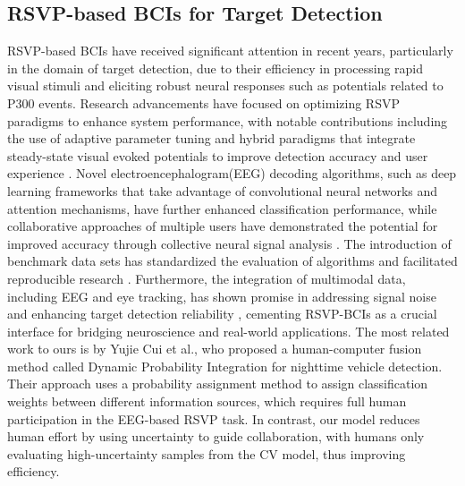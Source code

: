 \subsection{RSVP-based BCIs for Target Detection}
RSVP-based BCIs have received significant attention in recent years, particularly in the domain of target detection, due to their efficiency in processing rapid visual stimuli and eliciting robust neural responses such as potentials related to P300 events. Research advancements have focused on optimizing RSVP paradigms to enhance system performance, with notable contributions including the use of adaptive parameter tuning and hybrid paradigms that integrate steady-state visual evoked potentials to improve detection accuracy and user experience \cite{jalilpour2020novel}. Novel electroencephalogram(EEG) decoding algorithms, such as deep learning frameworks that take advantage of convolutional neural networks \cite{santamaria2020eeg} and attention mechanisms\cite{wang2020linking}, have further enhanced classification performance, while collaborative approaches of multiple users have demonstrated the potential for improved accuracy through collective neural signal analysis \cite{9931160}. The introduction of benchmark data sets has standardized the evaluation of algorithms and facilitated reproducible research \cite{zhang2020benchmark}. Furthermore, the integration of multimodal data, including EEG and eye tracking, has shown promise in addressing signal noise and enhancing target detection reliability \cite{mao2023cross}, cementing RSVP-BCIs as a crucial interface for bridging neuroscience and real-world applications. The most related work to ours is by Yujie Cui et al.\cite{cui2022dynamic}, who proposed a human-computer fusion method called Dynamic Probability Integration for nighttime vehicle detection. Their approach uses a probability assignment method to assign classification weights between different information sources, which requires full human participation in the EEG-based RSVP task. In contrast, our model reduces human effort by using uncertainty to guide collaboration, with humans only evaluating high-uncertainty samples from the CV model, thus improving efficiency.